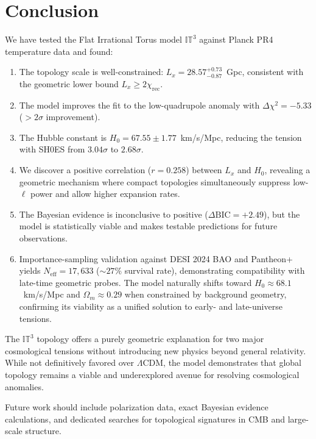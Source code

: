 \documentclass[a4paper,11pt]{article}
\begin{document}
\section{Conclusion}

We have tested the Flat Irrational Torus model $\mathbb{IT}^3$ against Planck PR4 temperature data and found:

\begin{enumerate}
    \item The topology scale is well-constrained: $L_x = 28.57^{+0.73}_{-0.87}$~Gpc, consistent with the geometric lower bound $L_x \geq 2\chi_{\text{rec}}$.
    
    \item The model improves the fit to the low-quadrupole anomaly with $\Delta\chi^2 = -5.33$ ($>2\sigma$ improvement).
    
    \item The Hubble constant is $H_0 = 67.55 \pm 1.77$~km/s/Mpc, reducing the tension with SH0ES from $3.04\sigma$ to $2.68\sigma$.
    
    \item We discover a positive correlation ($r=0.258$) between $L_x$ and $H_0$, revealing a geometric mechanism where compact topologies simultaneously suppress low-$\ell$ power and allow higher expansion rates.
    
    \item The Bayesian evidence is inconclusive to positive ($\Delta\text{BIC} = +2.49$), but the model is statistically viable and makes testable predictions for future observations.
    
    \item Importance-sampling validation against DESI 2024 BAO and Pantheon+ yields $N_{\text{eff}} = 17,633$ ($\sim 27\%$ survival rate), demonstrating compatibility with late-time geometric probes. The model naturally shifts toward $H_0 \approx 68.1$~km/s/Mpc and $\Omega_m \approx 0.29$ when constrained by background geometry, confirming its viability as a unified solution to early- and late-universe tensions.
\end{enumerate}

The $\mathbb{IT}^3$ topology offers a purely geometric explanation for two major cosmological tensions without introducing new physics beyond general relativity. While not definitively favored over $\Lambda$CDM, the model demonstrates that global topology remains a viable and underexplored avenue for resolving cosmological anomalies.

Future work should include polarization data, exact Bayesian evidence calculations, and dedicated searches for topological signatures in CMB and large-scale structure.
\end{document}
